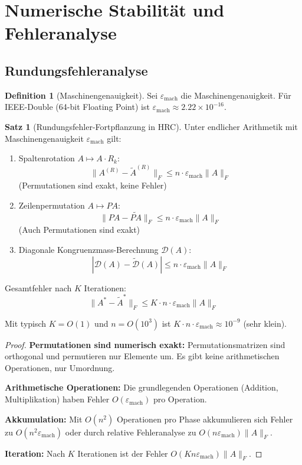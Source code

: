 \documentclass[a4paper,12pt]{article}
\theoremstyle{definition}
\newtheorem{definition}{Definition}
\newtheorem{satz}{Satz}
\begin{document}
\section{Numerische Stabilität und Fehleranalyse}

\subsection{Rundungsfehleranalyse}

\begin{definition}[Maschinengenauigkeit]
Sei $\varepsilon_{\text{mach}}$ die Maschinengenauigkeit. Für IEEE-Double (64-bit Floating Point) ist $\varepsilon_{\text{mach}} \approx 2.22 \times 10^{-16}$.
\end{definition}

\begin{satz}[Rundungsfehler-Fortpflanzung in HRC]
Unter endlicher Arithmetik mit Maschinengenauigkeit $\varepsilon_{\text{mach}}$ gilt:

\begin{enumerate}
	\item Spaltenrotation $A \mapsto A \cdot R_k$: 
	\[
	\|A^{(R)} - \tilde{A}^{(R)}\|_F \leq n \cdot \varepsilon_{\text{mach}} \|A\|_F
	\]
	(Permutationen sind exakt, keine Fehler)
	
	\item Zeilenpermutation $A \mapsto PA$: 
	\[
	\|P A - \widetilde{PA}\|_F \leq n \cdot \varepsilon_{\text{mach}} \|A\|_F
	\]
	(Auch Permutationen sind exakt)
	
	\item Diagonale Kongruenzmass-Berechnung $\mathcal{D}(A)$: 
	\[
	|\mathcal{D}(A) - \tilde{\mathcal{D}}(A)| \leq n \cdot \varepsilon_{\text{mach}} \|A\|_F
	\]
\end{enumerate}

Gesamtfehler nach $K$ Iterationen: 
\[
\|A^* - \tilde{A}^*\|_F \leq K \cdot n \cdot \varepsilon_{\text{mach}} \|A\|_F
\]

Mit typisch $K = O(1)$ und $n = O(10^3)$ ist $K \cdot n \cdot \varepsilon_{\text{mach}} \approx 10^{-9}$ (sehr klein).
\end{satz}

\begin{proof}
\textbf{Permutationen sind numerisch exakt:} Permutationsmatrizen sind orthogonal und permutieren nur Elemente um. Es gibt keine arithmetischen Operationen, nur Umordnung.

\textbf{Arithmetische Operationen:} Die grundlegenden Operationen (Addition, Multiplikation) haben Fehler $O(\varepsilon_{\text{mach}})$ pro Operation.

\textbf{Akkumulation:} Mit $O(n^2)$ Operationen pro Phase akkumulieren sich Fehler zu $O(n^2 \varepsilon_{\text{mach}})$ oder durch relative Fehleranalyse zu $O(n \varepsilon_{\text{mach}}) \|A\|_F$.

\textbf{Iteration:} Nach $K$ Iterationen ist der Fehler $O(K n \varepsilon_{\text{mach}}) \|A\|_F$.
\end{proof}
\end{document}
